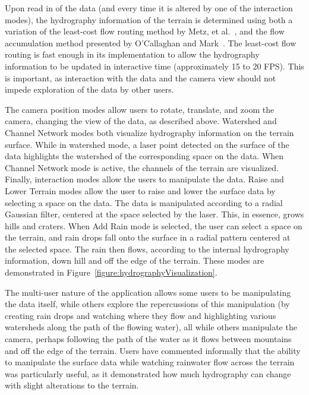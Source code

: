 \documentclass[review]{vgtc}                 %
\begin{document}
Upon read in of the data (and every time it is altered by one of the
interaction modes), the hydrography information of the terrain is
determined using both a variation of the least-cost flow routing
method by Metz, et al.~\cite{hess-15-667-2011}, and the flow
accumulation method presented by O'Callaghan and Mark~\cite{O'Callaghan1984323}. The least-cost flow routing is fast
enough in its implementation to allow the hydrography information to
be updated in interactive time (approximately 15 to 20 FPS). This is
important, as interaction with the data and the camera view should not
impede exploration of the data by other users.

The camera position modes allow users to rotate, translate, and zoom the camera, changing the view of the data, as 
described above. Watershed and Channel Network modes both visualize hydrography information on the terrain surface. 
While in watershed mode, a laser point detected on the surface of the data highlights the watershed of the corresponding 
space on the data. When Channel Network mode is active, the channels of the terrain are visualized. 
Finally, interaction modes allow the users to manipulate the
data. Raise and Lower Terrain modes allow the user to raise and lower
the surface data by selecting a space on the data. The data is
manipulated according to a radial Gaussian filter, centered at the
space selected by the laser. This, in essence, grows hills and
craters. When Add Rain mode is selected, the user can select a space
on the terrain, and rain drops fall onto the surface in a radial
pattern centered at the selected space. The rain then flows, according
to the internal hydrography information, down hill and off the edge of
the terrain. These modes are demonstrated in
Figure~\ref{figure:hydrographyVisualization}.

The multi-user nature of the application allows some users to be manipulating the data itself, while others explore 
the repercussions of this manipulation (by creating rain drops and watching where they flow and highlighting various 
watersheds along the path of the flowing water), all while others manipulate the camera, perhaps following the path 
of the water as it flows between mountains and off the edge of the terrain. Users have commented informally that the 
ability to manipulate the surface data while watching rainwater flow across the terrain was particularly useful, as 
it demonstrated how much hydrography can change with slight alterations to the terrain.
\end{document}
